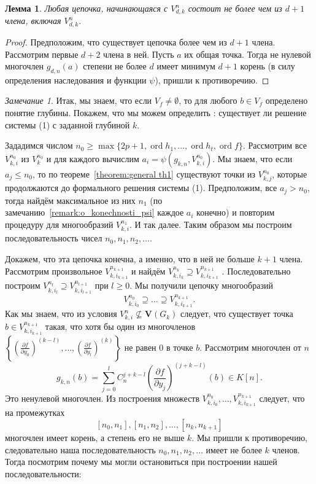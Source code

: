 \documentclass[16pt]{article}
\DeclareMathOperator{\ord}{ord}
\renewcommand{\le}{\leqslant} %
\renewcommand{\ge}{\geqslant} %
\theoremstyle{plain1}
\newtheorem{lemma}[theorem1]{Лемма}
\theoremstyle{plain2}
\theoremstyle{plain}
\theoremstyle{plain3}
\theoremstyle{definition}
\theoremstyle{remark}
\newtheorem{remark}[theorem1]{Замечание}
\begin{document}
\begin{lemma}\label{lemma:o_konechnosti_cepochek}
Любая цепочка, начинающаяся с ${V}_{d,k}^{n}$ состоит не более чем из  $d+1$ члена, включая ${V}_{d,k}^{n}$.
\end{lemma}

\begin{proof}
Предположим, что  существует цепочка более чем из $d+1$ члена. Рассмотрим первые $d+2$  члена в ней. Пусть $a$ их общая точка. Тогда не нулевой многочлен $g_{d,n}(a)$ степени не более $d$ имеет минимум $d+1$  корень (в силу определения наследования и функции $\psi$), пришли к противоречию.
\end{proof}


\begin{remark}\label{remark:o_syshestvovvanii reshenia c zadannoi glubinoi}
Итак, мы знаем, что если ${V}_f\neq\emptyset$, то для любого $b\in {V}_f$ определено понятие глубины. Покажем, что мы можем определить : существует ли решение системы (1) с заданной глубиной $k$.

Зададимся числом $n_0\ge\max\{ 2p+1,\ord{h_1},\ldots,\ord{h_t},\ord{f}\}$. Рассмотрим все ${V}_{k,i}^{n_0}$ из $V_k^{n_0}$  и для каждого вычислим $a_i=\psi(g_{k,n}, {V}_{k,i}^{n_0})$. Мы знаем, что если $a_j\le n_0$, то по теореме~\ref{theorem:general th1} существуют точки из ${V}_{k,j}^{n_0}$, которые продолжаются до формального решения системы (1). Предположим, все $a_j>n_0$, тогда найдём максимальное из них $n_1$ (по замечанию~\ref{remark:o_konechnosti_psi} каждое $a_i$ конечно) и повторим процедуру для многообразий ${V}_{k,i}^{n_1}$. И так далее. Таким образом мы построим последовательность чисел $n_0,n_1,n_2,\ldots$.

Докажем, что эта цепочка конечна, а именно, что в ней не больше $k+1$ члена. Рассмотрим произвольное ${V}_{k,i_{k+1}}^{n_{k+1}}$  и найдём ${V}_{k,i_{k}}^{n_{k}}\supseteq {V}_{k,i_{k+1}}^{n_{k+1}}$ . Последовательно построим ${V}_{k,i_{l}}^{n_{l}}\supseteq {V}_{k,i_{l+1}}^{n_{l+1}}$ при $l\ge 0$. Мы получили цепочку многообразий
$$
{V}_{k,i_{0}}^{n_{0}}\supseteq\ldots\supseteq {V}_{k,i_{k+1}}^{n_{k+1}}.
$$
   Как мы знаем, что из условия ${V}_{k,i}^n \not\subseteq \mathbf{V}(G_k)$ следует, что существует точка $b\in {V}_{k,i_{k+1}}^{n_{k+1}}$ такая, что хотя бы один из многочленов $\left\{\left(\frac{\partial f}{\partial y_0}\right)^{(k-l)},\ldots, \left(\frac{\partial f}{\partial y_l}\right)^{(k)} \right\}$ не равен 0 в точке $b$.
Рассмотрим многочлен от $n$
$$
g_{k,n}(b)=\sum\limits_{j=0}^{l}C_n^{j+k - l }\left(\frac{\partial f}{\partial y_j}\right)^{(j+k - l)}(b)\in K[n].
$$
Это ненулевой многочлен. Из построения множеств ${V}_{k,i_{0}}^{n_{0}},\ldots, {V}_{k,i_{k+1}}^{n_{k+1}}$ следует, что на промежутках $$[n_0,n_1],[n_1,n_2],\ldots,[n_k,n_{k+1}]$$
многочлен имеет корень, а степень его не выше $k$. Мы пришли к противоречию, следовательно наша последовательность  $n_0,n_1,n_2,\ldots$ имеет не более $k$ членов. Тогда посмотрим почему мы могли остановиться при построении нашей последовательности:


\end{remark}
\end{document}
